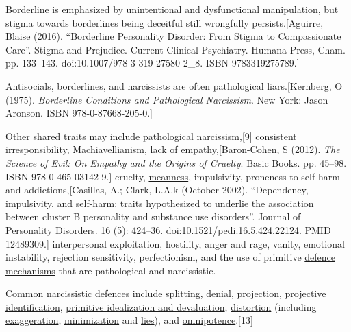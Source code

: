 \documentclass{book}
\numberwithin{equation}{section}
\begin{document}
Borderline is emphasized by unintentional and dysfunctional manipulation, but stigma towards borderlines being deceitful still wrongfully persists.[Aguirre, Blaise (2016). ``Borderline Personality Disorder: From Stigma to Compassionate Care''. Stigma and Prejudice. Current Clinical Psychiatry. Humana Press, Cham. pp. 133--143. doi:10.1007/978-3-319-27580-2\_8. ISBN 9783319275789.]

Antisocials, borderlines, and narcissists are often \href{https://en.wikipedia.org/wiki/Pathological_lying}{pathological liars}.[Kernberg, O (1975). \textit{Borderline Conditions and Pathological Narcissism}. New York: Jason Aronson. ISBN 978-0-87668-205-0.]

Other shared traits may include pathological narcissism,[9] consistent irresponsibility, \href{https://en.wikipedia.org/wiki/Machiavellianism_(psychology)}{Machiavellianism}, lack of \href{https://en.wikipedia.org/wiki/Empathy}{empathy},[Baron-Cohen, S (2012). \textit{The Science of Evil: On Empathy and the Origins of Cruelty}. Basic Books. pp. 45--98. ISBN 978-0-465-03142-9.] cruelty, \href{https://en.wikipedia.org/wiki/Meanness}{meanness}, impulsivity, proneness to self-harm and addictions,[Casillas, A.; Clark, L.A.k (October 2002). ``Dependency, impulsivity, and self-harm: traits hypothesized to underlie the association between cluster B personality and substance use disorders''. Journal of Personality Disorders. 16 (5): 424--36. doi:10.1521/pedi.16.5.424.22124. PMID 12489309.] interpersonal exploitation, hostility, anger and rage, vanity, emotional instability, rejection sensitivity, perfectionism, and the use of primitive \href{https://en.wikipedia.org/wiki/Defence_mechanisms}{defence mechanisms} that are pathological and narcissistic.

Common \href{https://en.wikipedia.org/wiki/Narcissistic_defences}{narcissistic defences} include \href{https://en.wikipedia.org/wiki/Splitting_(psychology)}{splitting}, \href{https://en.wikipedia.org/wiki/Denial}{denial}, \href{https://en.wikipedia.org/wiki/Psychological_projection}{projection}, \href{https://en.wikipedia.org/wiki/Projective_identification}{projective identification}, \href{https://en.wikipedia.org/wiki/Idealization_and_devaluation}{primitive idealization and devaluation}, \href{https://en.wikipedia.org/wiki/Cognitive_distortion}{distortion} (including \href{https://en.wikipedia.org/wiki/Exaggeration}{exaggeration}, \href{https://en.wikipedia.org/wiki/Minimisation_(psychology)}{minimization} and \href{https://en.wikipedia.org/wiki/Lie}{lies}), and \href{https://en.wikipedia.org/wiki/Omnipotence}{omnipotence}.[13]
\end{document}
